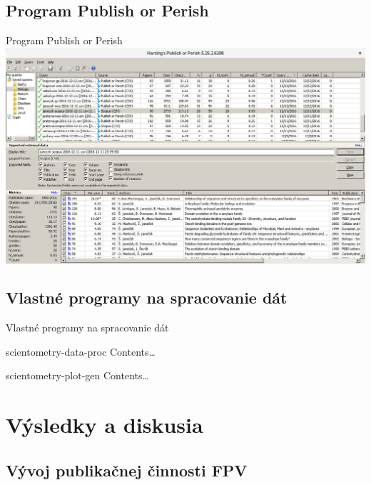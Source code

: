 \documentclass{beamer}
\begin{document}
\subsection{Program Publish or Perish}

%
%
\begin{frame}{Program Publish or Perish}
  \includegraphics[scale=0.255]{publish-or-perish_wine.png} \\[-1ex]
  \parbox{\textwidth}{\centering\tiny \citet{Harzing2011}}
\end{frame}


\subsection{Vlastné programy na spracovanie dát}

%
%
\begin{frame}{Vlastné programy na spracovanie dát}
  \begin{block}{scientometry-data-proc}
    Contents\dots
  \end{block}

  \begin{block}{scientometry-plot-gen}
    Contents\dots
  \end{block}
\end{frame}


\section{Výsledky a diskusia}

\subsection{Vývoj publikačnej činnosti FPV}
\end{document}
